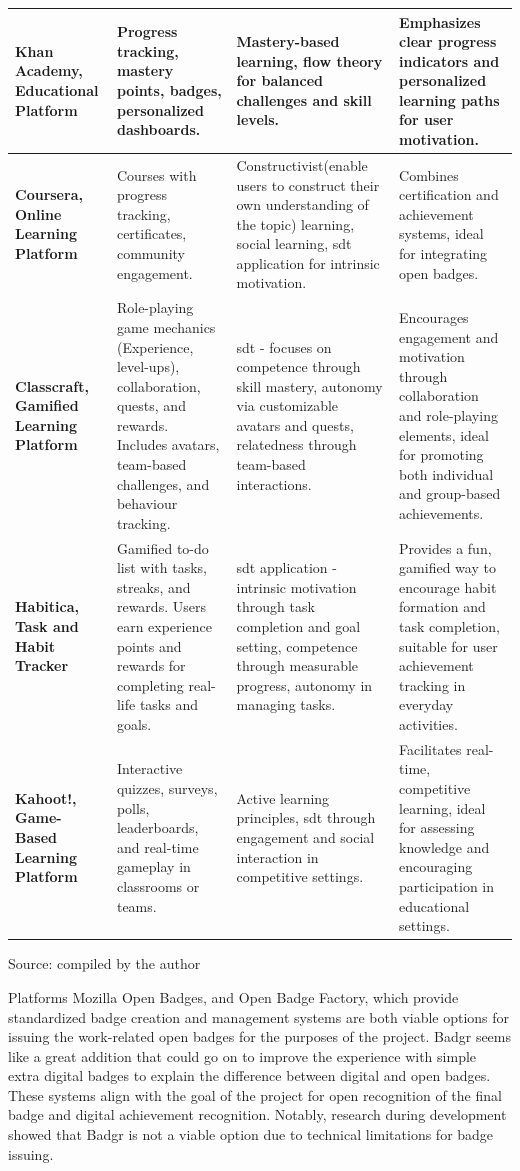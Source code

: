 \begin{longtable}[c]{|p{2.5cm}|p{4cm}|p{4cm}|p{4cm}|}
\hline
\textbf{Khan Academy, Educational Platform} & Progress tracking, mastery points, badges, personalized dashboards. & Mastery-based learning, flow theory for balanced challenges and skill levels. & Emphasizes clear progress indicators and personalized learning paths for user motivation. \\
\hline
\textbf{Coursera, Online Learning Platform} & Courses with progress tracking, certificates, community engagement. & Constructivist(enable users to construct their own understanding of the topic) learning, social learning, \acrshort{sdt} application for intrinsic motivation. & Combines certification and achievement systems, ideal for integrating open badges. \\
\hline
\textbf{Classcraft, Gamified Learning Platform} & Role-playing game mechanics (Experience, level-ups), collaboration, quests, and rewards. Includes avatars, team-based challenges, and behaviour tracking. & \acrshort{sdt} - focuses on competence through skill mastery, autonomy via customizable avatars and quests, relatedness through team-based interactions. & Encourages engagement and motivation through collaboration and role-playing elements, ideal for promoting both individual and group-based achievements. \\ \hline 
\textbf{Habitica, Task and Habit Tracker} & Gamified to-do list with tasks, streaks, and rewards. Users earn experience points and rewards for completing real-life tasks and goals. & \acrshort{sdt} application - intrinsic motivation through task completion and goal setting, competence through measurable progress, autonomy in managing tasks. & Provides a fun, gamified way to encourage habit formation and task completion, suitable for user achievement tracking in everyday activities. \\ \hline 
\textbf{Kahoot!, Game-Based Learning Platform} & Interactive quizzes, surveys, polls, leaderboards, and real-time gameplay in classrooms or teams. & Active learning principles, \acrshort{sdt} through engagement and social interaction in competitive settings. & Facilitates real-time, competitive learning, ideal for assessing knowledge and encouraging participation in educational settings. \\ \hline
\end{longtable}
{\raggedright \small{Source:} compiled by the author\par}

Platforms Mozilla Open Badges, and Open Badge Factory, which provide standardized badge creation and management systems are both viable options for issuing the work-related open badges for the purposes of the project. 
Badgr seems like a great addition that could go on to improve the experience with simple extra digital badges to explain the difference between digital and open badges. 
These systems align with the goal of the project for open recognition of the final badge and digital achievement recognition. 
Notably, research during development showed that Badgr is not a viable option due to technical limitations for badge issuing.

